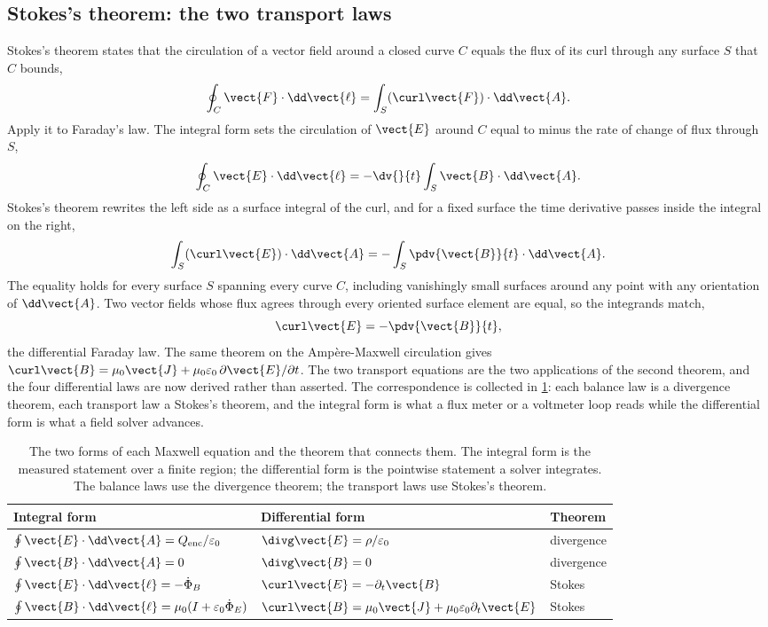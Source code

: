 \subsection{Stokes's theorem: the two transport laws}

Stokes's theorem states that the circulation of a vector field around a
closed curve $C$ equals the flux of its curl through any surface $S$ that
$C$ bounds,
\[
\oint_{C}\vect{F}\cdot\dd\vect{\ell} = \int_{S}(\curl\vect{F})\cdot
\dd\vect{A}.
\]
Apply it to Faraday's law. The integral form sets the circulation of
$\vect{E}$ around $C$ equal to minus the rate of change of flux through
$S$,
\[
\oint_{C}\vect{E}\cdot\dd\vect{\ell} = -\dv{}{t}\int_{S}\vect{B}\cdot
\dd\vect{A}.
\]
Stokes's theorem rewrites the left side as a surface integral of the
curl, and for a fixed surface the time derivative passes inside the
integral on the right,
\[
\int_{S}(\curl\vect{E})\cdot\dd\vect{A} = -\int_{S}\pdv{\vect{B}}{t}\cdot
\dd\vect{A}.
\]
The equality holds for every surface $S$ spanning every curve $C$,
including vanishingly small surfaces around any point with any
orientation of $\dd\vect{A}$. Two vector fields whose flux agrees through
every oriented surface element are equal, so the integrands match,
\[
\curl\vect{E} = -\pdv{\vect{B}}{t},
\]
the differential Faraday law. The same theorem on the
Amp\`ere-Maxwell circulation gives $\curl\vect{B} = \mu_0\vect{J} +
\mu_0\varepsilon_0\,\partial\vect{E}/\partial t$. The two transport
equations are the two applications of the second theorem, and the four
differential laws are now derived rather than asserted. The
correspondence is collected in
\cref{tab:vol04ch08:integral-differential}: each balance law is a
divergence theorem, each transport law a Stokes's theorem, and the
integral form is what a flux meter or a voltmeter loop reads while the
differential form is what a field solver advances.

\begin{table}[htbp]
\centering
\caption[Integral and differential forms]{The two forms of each Maxwell
equation and the theorem that connects them. The integral form is the
measured statement over a finite region; the differential form is the
pointwise statement a solver integrates. The balance laws use the
divergence theorem; the transport laws use Stokes's theorem.}
\label{tab:vol04ch08:integral-differential}
\small
\begin{tabular}{@{}lll@{}}
\toprule
Integral form & Differential form & Theorem \\
\midrule
$\oint\vect{E}\cdot\dd\vect{A} = Q_{\text{enc}}/\varepsilon_0$ &
$\divg\vect{E} = \rho/\varepsilon_0$ & divergence \\
$\oint\vect{B}\cdot\dd\vect{A} = 0$ &
$\divg\vect{B} = 0$ & divergence \\
$\oint\vect{E}\cdot\dd\vect{\ell} = -\dot\Phi_B$ &
$\curl\vect{E} = -\partial_t\vect{B}$ & Stokes \\
$\oint\vect{B}\cdot\dd\vect{\ell} = \mu_0(I + \varepsilon_0\dot\Phi_E)$ &
$\curl\vect{B} = \mu_0\vect{J} + \mu_0\varepsilon_0\partial_t\vect{E}$ &
Stokes \\
\bottomrule
\end{tabular}
\end{table}

